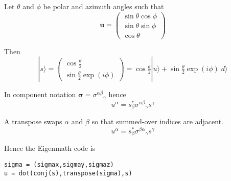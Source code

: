 \documentclass[12pt]{article}
\begin{document}
Let $\theta$ and $\phi$ be polar and azimuth angles such that
\begin{equation*}
\mathbf u=\begin{pmatrix}\sin\theta\cos\phi\\\sin\theta\sin\phi\\\cos\theta\end{pmatrix}
\end{equation*}

Then
\begin{equation*}
|s\rangle=\begin{pmatrix}\cos\frac{\theta}{2}\\\sin\frac{\theta}{2}\exp(i\phi)\end{pmatrix}
=\cos\tfrac{\theta}{2}|u\rangle+\sin\tfrac{\theta}{2}\exp(i\phi)|d\rangle
\end{equation*}

In component notation $\boldsymbol\sigma=\sigma^{\alpha\beta}{}_\gamma$ hence
\begin{equation*}
u^\alpha=s_\beta^*\sigma^{\alpha\beta}{}_\gamma s^\gamma
\end{equation*}

A transpose swaps $\alpha$ and $\beta$ so that summed-over indices are adjacent.
\begin{equation*}
u^\alpha=s_\beta^*\sigma^{\beta\alpha}{}_\gamma s^\gamma
\end{equation*}

Hence the Eigenmath code is
{\footnotesize\begin{verbatim}
sigma = (sigmax,sigmay,sigmaz)
u = dot(conj(s),transpose(sigma),s)
\end{verbatim}}
\end{document}
